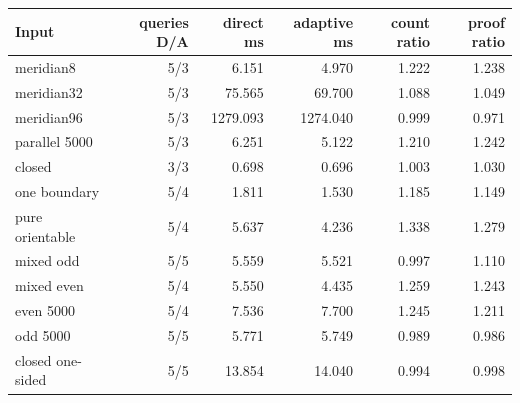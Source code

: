 \begin{center}\small
\begin{tabular}{@{}lrrrrr@{}}
\toprule
Input & queries D/A & direct ms & adaptive ms & count ratio & proof ratio \\
\midrule
meridian8 & 5/3 & 6.151 & 4.970 & 1.222 & 1.238 \\
meridian32 & 5/3 & 75.565 & 69.700 & 1.088 & 1.049 \\
meridian96 & 5/3 & 1279.093 & 1274.040 & 0.999 & 0.971 \\
parallel 5000 & 5/3 & 6.251 & 5.122 & 1.210 & 1.242 \\
closed & 3/3 & 0.698 & 0.696 & 1.003 & 1.030 \\
one boundary & 5/4 & 1.811 & 1.530 & 1.185 & 1.149 \\
pure orientable & 5/4 & 5.637 & 4.236 & 1.338 & 1.279 \\
mixed odd & 5/5 & 5.559 & 5.521 & 0.997 & 1.110 \\
mixed even & 5/4 & 5.550 & 4.435 & 1.259 & 1.243 \\
even 5000 & 5/4 & 7.536 & 7.700 & 1.245 & 1.211 \\
odd 5000 & 5/5 & 5.771 & 5.749 & 0.989 & 0.986 \\
closed one-sided & 5/5 & 13.854 & 14.040 & 0.994 & 0.998 \\
\bottomrule
\end{tabular}
\end{center}
